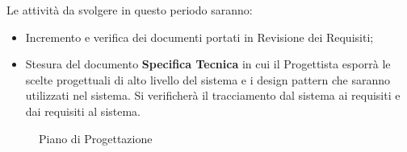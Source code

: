 {{	Le attività da svolgere in questo periodo saranno:
	\begin{itemize}
		\item Incremento e verifica dei documenti portati in Revisione dei Requisiti;
		\item Stesura del documento \textbf{Specifica Tecnica} in cui il Progettista esporrà le scelte progettuali di alto livello del sistema e i design pattern che saranno utilizzati nel sistema. Si verificherà il tracciamento dal sistema ai requisiti e dai requisiti al sistema.
	\end{itemize}
	
	\begin{landscape}
		\thispagestyle{empty}
		\begin{figure}[H]
			\parbox[c][\textwidth][s]{\linewidth}{
			\centering
			\vspace*{\fill}
			\vspace*{\fill}
			\label{fig:pianoprogettazione}
			\caption{Piano di Progettazione}}
		\end{figure}
	\end{landscape}

}}
